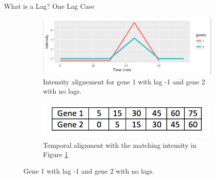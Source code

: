 \documentclass[10pt]{beamer}
\begin{document}
\begin{frame}{What is a Lag? One Lag Case}
\begin{figure}
    \centering
        \begin{subfigure}{.75\textwidth}
          \centering
          \includegraphics[width=1.2\linewidth]{lag2.png}
          \caption{Intensity alignement for gene 1 with lag -1 and gene 2 with no lags.}
          \label{fig:lag21}
        \end{subfigure}
       \begin{subfigure}{.75\textwidth}
          \centering
          \includegraphics[width=.8\linewidth]{table2.png}
          \caption{Temporal alignment with the matching intensity in Figure \ref{fig:lag21}}
          \label{fig:lag22}
        \end{subfigure}
    \caption{Gene 1 with lag -1 and gene 2 with no lags.}
    \label{fig:test}
    \end{figure}

\end{frame}
\end{document}
